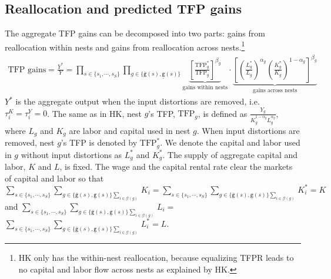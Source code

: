 \documentclass[12pt]{article}
\begin{document}
\subsection{Reallocation and predicted TFP gains}
The aggregate TFP gains can be decomposed into two parts: gains from reallocation within nests and gains from reallocation across nests.\footnote{HK only has the within-nest reallocation, because equalizing TFPR leads to no capital and labor flow across nests as explained by HK.}
\begin{align}
\text{TFP gains}=\frac{Y^*}{Y}=\prod_{s \in \{s_1, \cdots, s_S \} }\prod_{g\in\{\bar{\mathtt{g}}(s), \underline{\mathtt{g}}(s)\}} \underbrace{\left[ \frac{\text{TFP}_g^*}{\text{TFP}_g} \right]^{\beta_g}}_{\text{gains within nests}} \cdot \underbrace{ \left[ \left( \frac{L_g^*}{L_g} \right)^{\alpha_g}  \left( \frac{K_g^*}{K_g} \right)^{1-\alpha_g} \right]^{\beta_g}}_{\text{gains across nests}} \label{Eq:totalTFPgains}
\end{align}
$Y^*$ is the aggregate output when the input distortions are removed, i.e. $\tau_i^K=\tau_i^Y=0$. The same as in HK, nest $g$'s TFP, $\text{TFP}_g$, is defined as $\frac{Y_g}{K_g^{1-\alpha_g}L_g^{\alpha_g}}$, where $L_g$ and $K_g$ are labor and capital used in nest $g$. When input distortions are removed, nest $g$'s TFP is denoted by $\text{TFP}_g^*$. We denote the capital and labor used in $g$ without input distortions as $L^*_g$ and $K^*_g$. The supply of aggregate capital and labor, $K$ and $L$, is fixed. The wage and the capital rental rate clear the markets of capital and labor so that $\sum_{s \in \{s_1, \cdots, s_S \} }\sum_{g\in\{\bar{\mathtt{g}}(s), \underline{\mathtt{g}}(s)\} \sum_{i \in \mathcal{G}(g)}}K_i=\sum_{s \in \{s_1, \cdots, s_S \} }\sum_{g\in\{\bar{\mathtt{g}}(s), \underline{\mathtt{g}}(s)\} \sum_{i \in \mathcal{G}(g)}}K_i^*=K$ and $\sum_{s \in \{s_1, \cdots, s_S \} }\sum_{g\in\{\bar{\mathtt{g}}(s), \underline{\mathtt{g}}(s)\} \sum_{i \in \mathcal{G}(g)}}L_i=$\newline
$\sum_{s \in \{s_1, \cdots, s_S \} }\sum_{g\in\{\bar{\mathtt{g}}(s), \underline{\mathtt{g}}(s)\} \sum_{i \in \mathcal{G}(g)}}L_i^*=L$.
\end{document}
